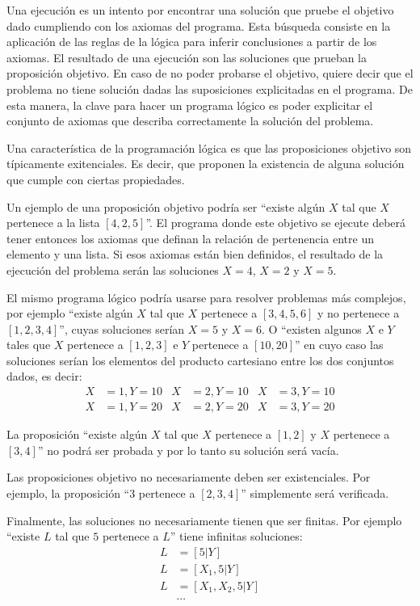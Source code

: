\documentclass[12pt,titlepage]{article}
\begin{document}
Una ejecución es un intento por encontrar una solución que pruebe el objetivo dado cumpliendo con los axiomas del programa. Esta búsqueda consiste en la aplicación de las reglas de la lógica para inferir conclusiones a partir de los axiomas. El resultado de una ejecución son las soluciones que prueban la proposición objetivo. En caso de no poder probarse el objetivo, quiere decir que el problema no tiene solución dadas las suposiciones explicitadas en el programa. De esta manera, la clave para hacer un programa lógico es poder explicitar el conjunto de axiomas que describa correctamente la solución del problema.

Una característica de la programación lógica es que las proposiciones objetivo son típicamente exitenciales. Es decir, que proponen la existencia de alguna solución que cumple con ciertas propiedades. 

Un ejemplo de una proposición objetivo podría ser ``existe algún $X$ tal que $X$ pertenece a la lista $[4,2,5]$''. El programa donde este objetivo se ejecute deberá tener entonces los axiomas que definan la relación de pertenencia entre un elemento y una lista. Si esos axiomas están bien definidos, el resultado de la ejecución del problema serán las soluciones $X=4$, $X=2$ y $X=5$.

El mismo programa lógico podría usarse para resolver problemas más complejos, por ejemplo ``existe algún $X$ tal que $X$ pertenece a $[3,4,5,6]$ y no pertenece a $[1,2,3,4]$'', cuyas soluciones serían $X=5$ y $X=6$. O ``existen algunos $X$ e $Y$ tales que $X$ pertenece a $[1,2,3]$ e $Y$ pertenece a $[10,20]$'' en cuyo caso las soluciones serían los elementos del producto cartesiano entre los dos conjuntos dados, es decir:
\begin{align*}
X& =1,Y=10& X& =2,Y=10& X& =3,Y=10 \\
X& =1,Y=20& X& =2,Y=20& X& =3,Y=20
\end{align*}

La proposición ``existe algún $X$ tal que $X$ pertenece a $[1, 2]$ y $X$ pertenece a $[3, 4]$'' no podrá ser probada y por lo tanto su solución será vacía.

Las proposiciones objetivo no necesariamente deben ser existenciales. Por ejemplo, la proposición ``$3$ pertenece a $[2,3,4]$'' simplemente será verificada.

Finalmente, las soluciones no necesariamente tienen que ser finitas. Por ejemplo ``existe $L$ tal que $5$ pertenece a $L$'' tiene infinitas soluciones:
\begin{align*}
L& =[5|Y] \\
L& =[X_1, 5|Y] \\
L& =[X_1,X_2,5|Y] \\
 & \cdots
\end{align*}
\end{document}
